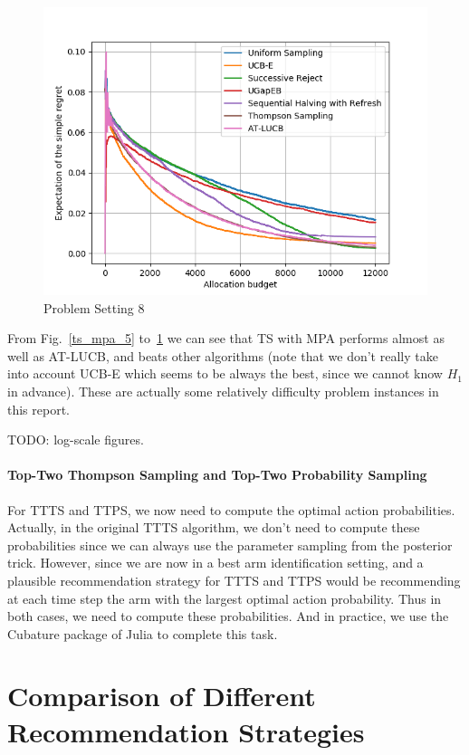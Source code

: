 \documentclass[runningheads,a4paper]{llncs}
\begin{document}
\begin{figure}[ht]
    	\centering\includegraphics[width=\textwidth]{../results/ts_mpa/setting8.png}
    	\caption{Problem Setting 8}
	\label{ts_mpa_8}
\end{figure}

From Fig.~\ref{ts_mpa_5} to~\ref{ts_mpa_8} we can see that TS with MPA performs almost as well as AT-LUCB, and beats other algorithms (note that we don't really take into account UCB-E which seems to be always the best, since we cannot know $H_1$ in advance). These are actually some relatively difficulty problem instances in this report.

TODO: log-scale figures.

\paragraph{\bfseries{Top-Two Thompson Sampling and Top-Two Probability Sampling}}
For TTTS and TTPS, we now need to compute the optimal action probabilities. Actually, in the original TTTS algorithm, we don't need to compute these probabilities since we can always use the parameter sampling from the posterior trick. However, since we are now in a best arm identification setting, and a plausible recommendation strategy for TTTS and TTPS would be recommending at each time step the arm with the largest optimal action probability. Thus in both cases, we need to compute these probabilities. And in practice, we use the Cubature package of Julia to complete this task.

\section{Comparison of Different Recommendation Strategies}
\end{document}
